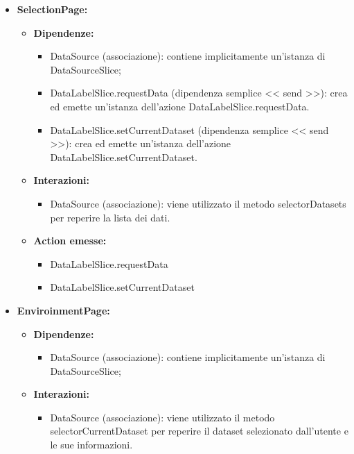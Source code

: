 \begin{itemize}
    \item \textbf{SelectionPage:}
    \begin{itemize}
        \item \textbf{Dipendenze:}
        \begin{itemize}
            \item DataSource (associazione): contiene implicitamente un'istanza di DataSourceSlice;
            \item DataLabelSlice.requestData (dipendenza semplice << send >>): crea ed emette un’istanza dell’azione DataLabelSlice.requestData.
            \item DataLabelSlice.setCurrentDataset (dipendenza semplice << send >>): crea ed emette un’istanza dell’azione DataLabelSlice.setCurrentDataset.
        \end{itemize} 
        \item \textbf{Interazioni:}
        \begin{itemize}
            \item DataSource (associazione): viene utilizzato il metodo selectorDatasets per reperire la lista dei dati.
        \end{itemize} 
        \item \textbf{Action emesse:}
        \begin{itemize}
            \item DataLabelSlice.requestData
            \item DataLabelSlice.setCurrentDataset
        \end{itemize} 
    \end{itemize}

    \item \textbf{EnviroinmentPage:}
    \begin{itemize}
        \item \textbf{Dipendenze:}
        \begin{itemize}
            \item DataSource (associazione): contiene implicitamente un'istanza di DataSourceSlice;
        \end{itemize} 
        \item \textbf{Interazioni:}
        \begin{itemize}
            \item DataSource (associazione): viene utilizzato il metodo selectorCurrentDataset per reperire il dataset selezionato dall'utente e le sue informazioni.
        \end{itemize}  
    \end{itemize}
\end{itemize}

